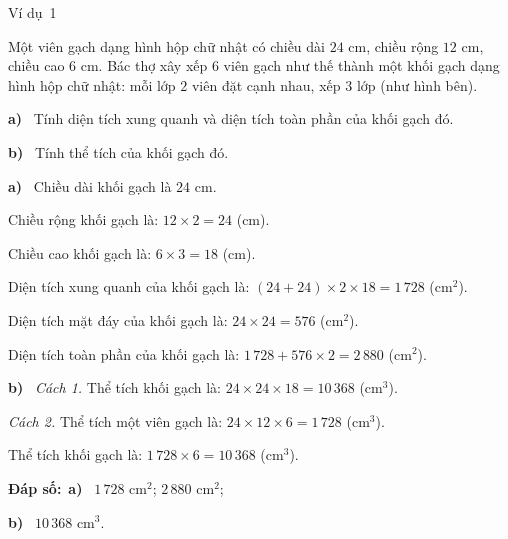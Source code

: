 \documentclass[11pt]{article}
\providecommand{\AnsWord}{Đáp số}
\newcommand{\dapso}[1]{\par\textbf{\AnsWord:}\ #1}
\newcommand{\guide}{\par\vspace{4pt}{\bfseries\color{tmBlue}\GuideWord}\par\vspace{3pt}\nopagebreak}
\newcommand{\pa}[1]{\textbf{#1)}\ }
\newcommand{\gap}{\vspace{0.3cm}}
\def\GuideWord{Hướng dẫn giải.}
\def\AnsWord{Đáp số}
\def\ExWord{Ví dụ}
\begin{document}
\begin{exbox}{\ExWord\ 1}
\begin{minipage}[t]{0.6\linewidth}
Một viên gạch dạng hình hộp chữ nhật có chiều dài $24$ cm, chiều rộng $12$ cm, chiều cao $6$ cm. Bác thợ xây xếp $6$ viên gạch như thế thành một khối gạch dạng hình hộp chữ nhật: mỗi lớp $2$ viên đặt cạnh nhau, xếp $3$ lớp (như hình bên).\par
\pa{a} Tính diện tích xung quanh và diện tích toàn phần của khối gạch đó.\par
\pa{b} Tính thể tích của khối gạch đó.
\end{minipage}\hfill
\begin{minipage}[t]{0.36\linewidth}\vspace{0pt}\centering
{}
\end{minipage}
\guide
\pa{a} Chiều dài khối gạch là $24$ cm.\par
Chiều rộng khối gạch là: $12\times2=24$ (cm).\par
Chiều cao khối gạch là: $6\times3=18$ (cm).\par
Diện tích xung quanh của khối gạch là: $(24+24)\times2\times18=1\,728$ (cm$^2$).\par
Diện tích mặt đáy của khối gạch là: $24\times24=576$ (cm$^2$).\par
Diện tích toàn phần của khối gạch là: $1\,728+576\times2=2\,880$ (cm$^2$).\par
\pa{b} \emph{Cách 1.} Thể tích khối gạch là: $24\times24\times18=10\,368$ (cm$^3$).\par
\emph{Cách 2.} Thể tích một viên gạch là: $24\times12\times6=1\,728$ (cm$^3$).\par
Thể tích khối gạch là: $1\,728\times6=10\,368$ (cm$^3$).
\dapso{\pa{a} $1\,728$ cm$^2$; $2\,880$ cm$^2$;\par \pa{b} $10\,368$ cm$^3$.}
\end{exbox}
\gap
\end{document}
